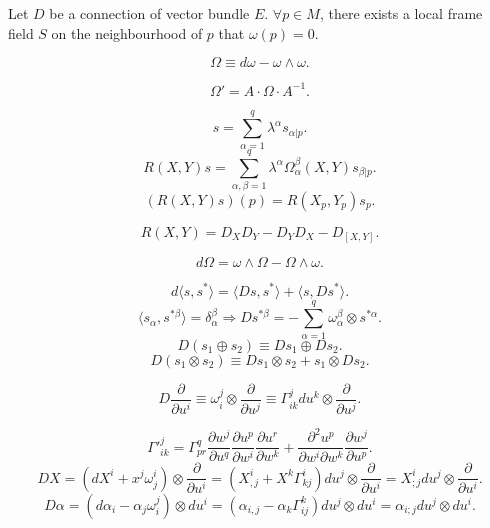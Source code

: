 \begin{newthem} 
Let $D$ be a connection of vector bundle $E$. $\forall p \in M$, there exists a local frame field $S$ on the neighbourhood of $p$ that $\omega(p) =0$.
\end{newthem}

\begin{newdef}
\[\Omega \equiv d\omega - \omega \wedge \omega.\]
\end{newdef}

\begin{newprop}
\[\Omega' = A \cdot \Omega \cdot A^{-1}.\]
\end{newprop}

\begin{newdef}
\[s = \sum_{\alpha=1}^{q} \lambda^{\alpha} s_{\alpha|p}.\]
\[R(X,Y)s = \sum_{\alpha,\beta=1}^{q} \lambda^{\alpha} \Omega^{\beta}_{\alpha}(X,Y)s_{\beta|p}.\]
\[(R(X,Y)s)(p) = R(X_p,Y_p)s_p.\]
\end{newdef}

\begin{newprop}
\[R(X,Y) = D_X D_Y - D_Y D_X -D_{[X,Y]}.\]
\end{newprop}

\begin{newthem}
\[d\Omega = \omega \wedge \Omega - \Omega \wedge \omega.\]
\end{newthem}

\begin{newdef}
\[d\langle s,s^* \rangle = \langle Ds,s^* \rangle + \langle s,Ds^* \rangle.\]
\[\langle s_{\alpha},s^{*\beta} \rangle  = \delta^{\beta}_{\alpha}  \Rightarrow Ds^{*\beta} = -\sum_{\alpha=1}^{q} \omega^{\beta}_{\alpha} \otimes s^{*\alpha}.\]
\[D(s_1 \oplus s_2) \equiv Ds_1 \oplus Ds_2.\]
\[D(s_1 \otimes s_2) \equiv Ds_1 \otimes s_2 + s_1 \otimes Ds_2.\]
\end{newdef}

\begin{newdef}
\[D\frac{\partial}{\partial u^i} \equiv \omega^j_i \otimes \frac{\partial}{\partial u^j} \equiv \Gamma^{j}_{ik} du^k \otimes \frac{\partial}{\partial u^j}.\]
\end{newdef}

\begin{newprop}
\[\Gamma'^{j}_{ik} = \Gamma^{q}_{pr} \frac{\partial w^j}{\partial u^q} \frac{\partial u^p}{\partial w^i} \frac{\partial u^r}{\partial w^k} + \frac{\partial^2 u^p}{\partial w^i \partial w^k} \frac{\partial w^j}{\partial u^p}.\]
\[DX = (dX^i + x^j \omega^i_j)\otimes \frac{\partial}{\partial u^i} = (X^i_{,j} + X^k \Gamma^{i}_{kj}) du^j \otimes \frac{\partial}{\partial u^i} = X^i_{;j}du^j \otimes \frac{\partial}{\partial u^i} .\]
\[D \alpha = (d\alpha_i - \alpha_j \omega^j_i)\otimes du^i = (\alpha_{i,j} -\alpha_k \Gamma^k_{ij})du^j \otimes du^i = \alpha_{i;j} du^j \otimes du^i .\]
\end{newprop}

